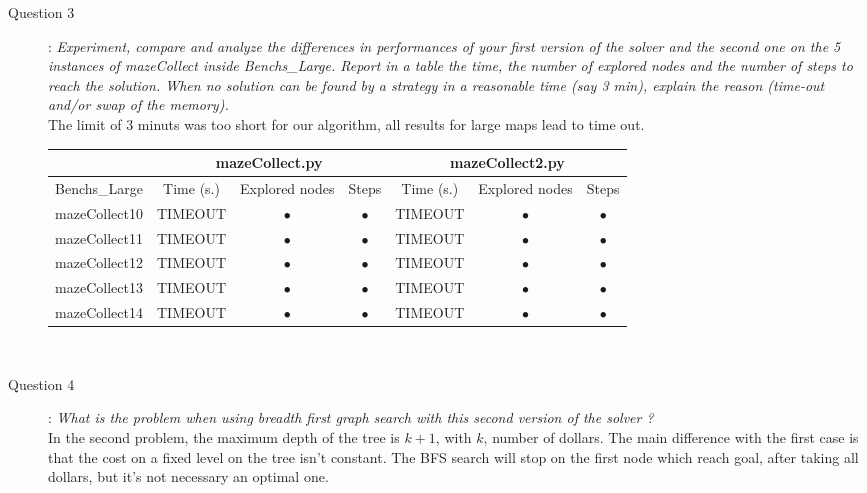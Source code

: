 \begin{description}

\item[Question 3]: \textit{Experiment, compare and analyze the differences in performances of your first version of the solver and the second one on the 5 instances of mazeCollect inside Benchs\_Large. Report in a table the time, the number of explored nodes and the number of steps to reach the solution. When no solution can be found by a strategy in a reasonable time (say 3 min), explain the reason (time-out and/or swap of the memory). }\\

The limit of 3 minuts was too short for our algorithm, all results for large maps lead to time out.
\begin{tabular}{|c|c|c|c|c|c|c|} \hline   & \multicolumn{3}{c|}{mazeCollect.py} & \multicolumn{3}{c|}{mazeCollect2.py} \\ 
\hline Benchs\_Large & Time (s.) & Explored nodes & Steps & Time (s.) & Explored nodes & Steps \\ \hline 
mazeCollect10 & TIMEOUT & $\bullet$ & $\bullet$ & TIMEOUT & $\bullet$ & $\bullet$\\
mazeCollect11 & TIMEOUT & $\bullet$ & $\bullet$ & TIMEOUT & $\bullet$ & $\bullet$\\
mazeCollect12 & TIMEOUT & $\bullet$ & $\bullet$ & TIMEOUT & $\bullet$ & $\bullet$\\
mazeCollect13 & TIMEOUT & $\bullet$ & $\bullet$ & TIMEOUT & $\bullet$ & $\bullet$\\
mazeCollect14 & TIMEOUT & $\bullet$ & $\bullet$ & TIMEOUT & $\bullet$ & $\bullet$\\
\hline
\end{tabular}\\

\item[Question 4]: \textit{What is the problem when using breadth first graph search with this second version of the solver ?} \\
In the second problem, the maximum depth of the tree is $k+1$, with $k$, number of dollars. The main difference with the first case is that the cost on a fixed level on the tree isn't constant. The BFS search will stop on the first node which reach goal, after taking all dollars, but it's not necessary an optimal one.


\end{description} 